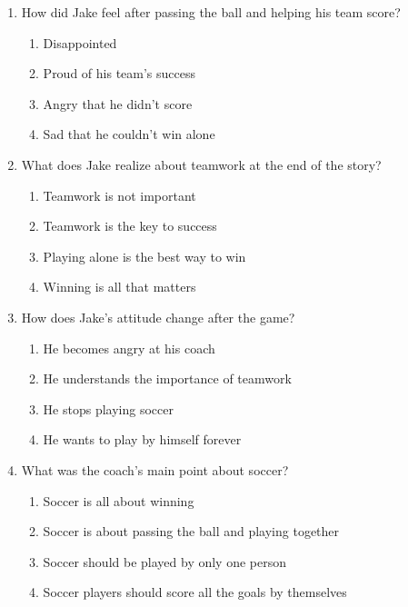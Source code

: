 \documentclass[12pt]{article}
\begin{document}
\begin{enumerate}
    \item How did Jake feel after passing the ball and helping his team score?
    \begin{enumerate}[label=\Alph*.]
        \item Disappointed
        \item Proud of his team’s success
        \item Angry that he didn’t score
        \item Sad that he couldn’t win alone
    \end{enumerate}
    \vspace{0.5cm}

    \item What does Jake realize about teamwork at the end of the story?
    \begin{enumerate}[label=\Alph*.]
        \item Teamwork is not important
        \item Teamwork is the key to success
        \item Playing alone is the best way to win
        \item Winning is all that matters
    \end{enumerate}
    \vspace{0.5cm}

    \item How does Jake’s attitude change after the game?
    \begin{enumerate}[label=\Alph*.]
        \item He becomes angry at his coach
        \item He understands the importance of teamwork
        \item He stops playing soccer
        \item He wants to play by himself forever
    \end{enumerate}
    \vspace{0.5cm}

\vspace{5cm}
    \item What was the coach’s main point about soccer?
    \begin{enumerate}[label=\Alph*.]
        \item Soccer is all about winning
        \item Soccer is about passing the ball and playing together
        \item Soccer should be played by only one person
        \item Soccer players should score all the goals by themselves
    \end{enumerate}
    \vspace{0.5cm}


\end{enumerate}
\end{document}
